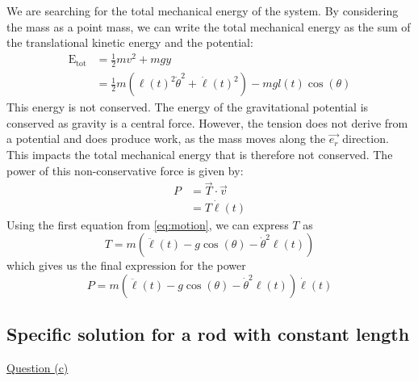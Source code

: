 We are searching for the total mechanical energy of the system. By considering the mass as a point mass, we can write the total mechanical energy as the sum of the translational kinetic energy and the potential:
\begin{equation}
    \begin{aligned}
        \mathrm{E_{tot}} &= \frac{1}{2}mv^2 + mgy \\
        &= \frac{1}{2}m(\ell(t)^2 \dot\theta^2 + \dot\ell(t)^2) - mgl(t)\cos(\theta)
    \end{aligned}
\end{equation}
This energy is not conserved. The energy of the gravitational potential is conserved as gravity is a central force. However, the tension does not derive from a potential and does produce work, as the mass moves along the \(\vec{e_r}\) direction. This impacts the total mechanical energy that is therefore not conserved. The power of this non-conservative force is given by:
\begin{equation}
    \begin{aligned}
        P &= \vec{T} \cdot \vec{v} \\
        &= T \dot\ell(t)
    \end{aligned}
\end{equation}
Using the first equation from \autoref{eq:motion}, we can express \(T\) as
\begin{equation}
    T = m(\ddot\ell(t) - g\cos(\theta) - \dot\theta^2 \ell(t))
\end{equation}
which gives us the final expression for the power
\begin{equation}
    P = m(\ddot\ell(t) - g\cos(\theta) - \dot\theta^2 \ell(t)) \dot\ell(t)
\end{equation}

\subsection{Specific solution for a rod with constant length}
\label{sec:analytic:constant_length}
\underline{Question (c)}

